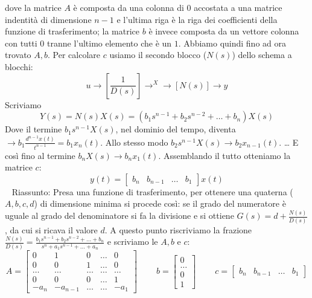 dove la matrice $A$ è composta da una colonna di $0$ accostata a una matrice indentità di dimensione $n-1$ e l'ultima riga è la riga dei coefficienti della funzione di trasferimento; la matrice $b$ è invece composta da un vettore colonna con tutti $0$ tranne l'ultimo elemento che è un $1$.\newline
\newline
Abbiamo quindi fino ad ora trovato $A,b$. Per calcolare $c$ usiamo il secondo blocco ($N(s)$) dello schema a blocchi:
\[
    u \rightarrow \left[\frac{1}{D(s)}\right] \rightarrow^X \rightarrow  \left[N(s)\right] \rightarrow  y
\]
Scriviamo
\[
    Y(s) = N(s) X(s) = (b_1 s^{n-1} + b_2 s^{n-2} + \dots + b_n) X(s)
\]
Dove il termine $b_1 s^{n-1} X(s)$, nel dominio del tempo, diventa $\rightarrow  b_1 \frac{d^{n-1}x(t)}{t^{n-1}} = b_1 x_n(t)$.\newline
Allo stesso modo $b_2 s^{n-1}X(s) \rightarrow b_2 x_{n-1}(t)$.\newline
\dots \newline
E così fino al termine $b_n X(s) \rightarrow  b_n x_1(t)$.\newline
Assemblando il tutto otteniamo la matrice $c$:
\[
    y(t) = \left[\begin{matrix}
        b_n & b_{n-1} & \dots & b_1
    \end{matrix}\right] x(t)
\]
\ \newline
\newline
Riassunto:\newline
Presa una funzione di trasferimento, per ottenere una quaterna ($A,b,c,d$) di dimensione minima si procede così: se il grado del numeratore è uguale al grado del denominatore si fa la divisione e si ottiene $G(s) = d + \frac{N(s)}{D(s)}$, da cui si ricava il valore $d$. A questo punto riscriviamo la frazione $\frac{N(s)}{D(s)} = \frac{ b_1 s^{n-1} + b_2 s^{n-2} + \dots + b_n }{ s^n + a_1 s^{n-1} + \dots + a_n }$ e scriviamo le $A, b$ e $c$:
\[
    A=\left[\begin{matrix}
        0 & 1 & 0 & \dots & 0 \\
        0 & 0 & 1 & \dots & 0 \\
        \dots & \dots &\dots&\dots&\dots\\
        0 & 0 & 0 & \dots & 1\\
        -a_n & -a_{n-1} & \dots & \dots & -a_1
    \end{matrix}\right] \;\;\;\;\;\;\;\; b=\left[\begin{matrix}
        0\\\dots\\0\\1
    \end{matrix}\right] \;\;\;\;\;\;\;\; c=\left[\begin{matrix}
        b_n & b_{n-1} & \dots & b_1
    \end{matrix}\right]
\]